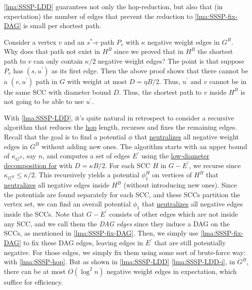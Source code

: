 \begin{intuition}
	\autoref{lma:SSSP-LDD} guarantees not only the hop-reduction, but also that (in expectation) the number of edges that prevent the reduction to \autoref{lma:SSSP-fix-DAG} is small per shortest path.
\end{intuition}

\begin{remark}
	Consider a vertex \(v\) and an \(s^{\ast} \)-\(v\) path \(P_v\) with \(\kappa \) negative weight edges in \(G^B\). Why does that path not exist in \(H^B\) since we proved that in \(H^B\) the shortest path to \(v\) can only contain \(\kappa / 2\) negative weight edges? The point is that suppose \(P_v\) has \((s, u^{\prime} )\) as its first edge. Then the above proof shows that there cannot be a \((v, u^{\prime} )\) path in \(G\) with weight at most \(D = \eta B / 2\). Thus, \(u^{\prime} \) and \(v\) cannot be in the same SCC with diameter bound \(D\). Thus, the shortest path to \(v\) inside \(H^B\) is not going to be able to use \(u^{\prime} \).
\end{remark}

With \autoref{lma:SSSP-LDD}, it's quite natural in retrospect to consider a recursive algorithm that reduces the \hyperref[not:hop]{hop} length, recurses and fixes the remaining edges. Recall that the goal is to find a potential \(\phi \) that \hyperref[def:neutralize]{neutralizes} all negative weight edges in \(G^B\) without adding new ones. The algorithm starts with an upper bound of \(\kappa _{G^B}\), say \(n\), and computes a set of edges \(E^{\prime} \) using the \hyperref[thm:directed-LDD]{low-diameter decomposition for} with \(D = \kappa B / 2\). For each SCC \(H\) in \(G - E^{\prime} \), we recurse since \(\kappa _{G^B} \leq \kappa / 2\). This recursively yields a potential \(\phi ^H_1\) on vertices of \(H^B\) that \hyperref[def:neutralize]{neutralizes} all negative edges inside \(H^B\) (without introducing new ones). Since the potentials are found separately for each SCC, and these SCCs partition the vertex set, we can find an overall potential \(\phi _1\) that \hyperref[def:neutralize]{neutralizes} all negative edges inside the SCCs. Note that \(G - E^{\prime} \) consists of other edges which are not inside any SCC, and we call them the \emph{DAG edges} since they induce a DAG on the SCCs, as mentioned in \autoref{lma:SSSP-fix-DAG}. Then, we simply use \autoref{lma:SSSP-fix-DAG} to fix these DAG edges, leaving edges in \(E^{\prime} \) that are still potentially negative. For those edges, we simply fix them using some sort of brute-force way: with \autoref{lma:SSSP-hop}. But as shown in \autoref{lma:SSSP-LDD} \autoref{lma:SSSP-LDD-i}, in \(G^B\), there can be at most \(O(\log ^2 n)\) negative weight edges in expectation, which suffice for efficiency.

